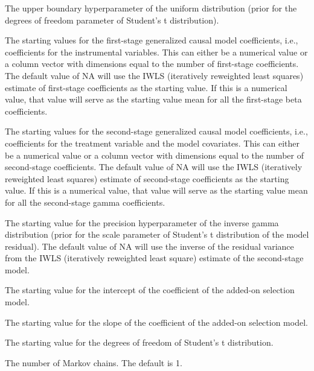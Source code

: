 \documentclass[a4paper]{book}
\begin{document}
\begin{Arguments}
\begin{ldescription}
\item[\code{V0}] The upper boundary hyperparameter of the uniform distribution (prior for the degrees of freedom
parameter of Student's t distribution).

\item[\code{beta.start}] The starting values for the first-stage generalized causal model coefficients,
i.e., coefficients for the instrumental variables.
This can either be a numerical value or a column vector with dimensions
equal to the number of first-stage coefficients.
The default value of NA will use the IWLS (iteratively reweighted least squares) estimate
of first-stage coefficients as the starting value.
If this is a numerical value, that value will
serve as the starting value mean for all the first-stage beta coefficients.

\item[\code{gamma.start}] The starting values for the second-stage generalized causal model coefficients,
i.e., coefficients for the treatment variable and the model covariates.
This can either be a numerical value or a column vector with dimensions
equal to the number of second-stage coefficients.
The default value of NA will use the IWLS (iteratively reweighted least squares) estimate
of second-stage coefficients as the starting value.
If this is a numerical value, that value will
serve as the starting value mean for all the second-stage gamma coefficients.

\item[\code{e.start}] The starting value for the precision hyperparameter of the inverse gamma distribution
(prior for the scale parameter of Student's t distribution of the model residual).
The default value of NA will use the inverse of the residual variance from the
IWLS (iteratively reweighted least square) estimate of the second-stage model.

\item[\code{lambda0.start}] The starting value for the intercept of the coefficient of the added-on selection model.

\item[\code{lambda1.start}] The starting value for the slope of the coefficient of the added-on selection model.

\item[\code{df.start}] The starting value for the degrees of freedom of Student's t distribution.

\item[\code{n.chains}] The number of Markov chains. The default is 1.


\end{ldescription}
\end{Arguments}
\end{document}
